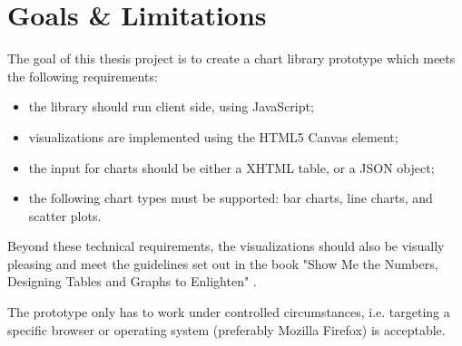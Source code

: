 \section{Goals \& Limitations}
The goal of this thesis project is to create a chart library prototype which meets the following requirements:
\begin{itemize}
\item the library should run client side, using JavaScript;
\item visualizations are implemented using the HTML5 Canvas element;
\item the input for charts should be either a XHTML table, or a JSON object;
\item the following chart types must be supported: bar charts, line charts, and scatter plots.
\end{itemize}
Beyond these technical requirements, the visualizations should also be visually pleasing and meet the guidelines set out in the book "Show Me the Numbers, Designing Tables and Graphs to Enlighten" \cite{few04}.

The prototype only has to work under controlled circumstances, i.e. targeting a specific browser or operating system (preferably Mozilla Firefox) is acceptable.
